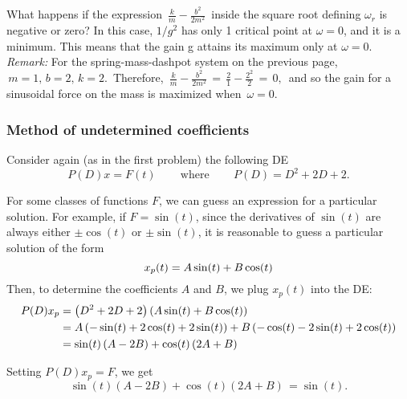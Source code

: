 \begin{enumerate}
  What happens if the expression $\, \displaystyle \frac{k}{m}-\frac{b^2}{2m^2}\,$
  inside the square root defining $\omega _r$ is negative or zero?
  In this case, $1/g^2$ has only 1 critical point at $\omega=0$,
  and it is a minimum. This means that the gain g attains its maximum only at $\omega=0$. \\

  \emph{Remark:} For the spring-mass-dashpot system on the previous page,
  $\, m=1,\, b=2,\, k=2.\,$
  Therefore, $\, \displaystyle \frac{k}{m}-\frac{b^2}{2m^2}\,
  =\, \frac{2}{1}-\frac{2^2}{2}\, =\, 0,\,$
  and so the gain for a sinusoidal force on the mass is maximized when
  $\, \omega =0$.  
\end{enumerate}

\clearpage

\subsubsection{Method of undetermined coefficients}

Consider again (as in the first problem) the following DE
\begin{equation*}
  P(D)x=F(t)\,  \qquad \text {where}\,  \qquad P(D)=D^2+2D+2.
\end{equation*}

For some classes of functions $F$, we can guess an expression for a particular solution.
For example, if $F = \sin⁡(t)$, since the derivatives of $\sin⁡(t)$ are always
either $\pm \cos⁡ (t)$ or $\pm \sin⁡ (t)$,
it is reasonable to guess a particular solution of the form
\begin{equation*}
  \displaystyle  \displaystyle x_ p(t)=A\sin (t)+B\cos (t)
\end{equation*}
Then, to determine the coefficients $A$ and $B$, we plug $x _p(t)$ into the DE:
\begin{align*}
  \displaystyle \displaystyle P(D) x_p
  \displaystyle
  &= \displaystyle \left(D^2+2D+2\right)\left( A\sin (t)+B\cos (t)\right) \\
  \displaystyle
  &= \displaystyle A\left(-\sin (t)+2\cos (t)+2\sin (t)\right)
    +B \left( -\cos (t)-2\sin (t)+2\cos (t) \right) \\
  \displaystyle
  &= \displaystyle \sin (t) \left( A -2B\right) +\cos (t) \left(2A+B\right)\,
\end{align*}

Setting $P(D)x_ p= F$, we get
\begin{equation*}
  \sin (t) \left( A -2B\right) +\cos (t) \left(2A+B\right)\,  = \sin (t).
\end{equation*}

